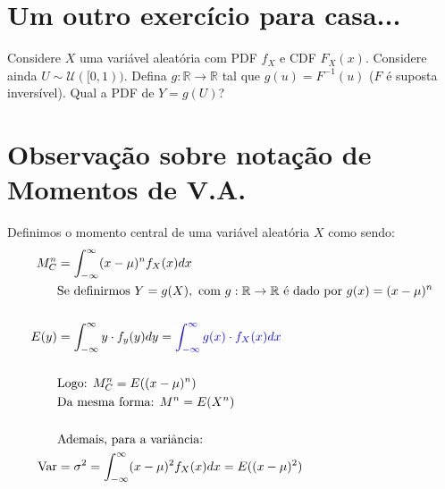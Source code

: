 \documentclass{article}
\makeatletter
\newcommand{\bb}[1]{\mathbb{#1}}
\def\mcolor#1#{\@mcolor{#1}}
\def\@mcolor#1#2#3{%
  \protect\leavevmode
  \begingroup
    \color#1{#2}#3%
  \endgroup
}
\makeatother
\begin{document}
\section{Um outro exercício para casa...}
Considere $X$ uma variável aleatória com PDF $f_X$ e CDF $F_X(x)$. Considere ainda $U \sim
\mathscr{U}([0,1))$. Defina $g:\bb{R} \rightarrow \bb{R}$ tal que $g(u) = F^{-1}(u)$ ($F$ é suposta
inversível). Qual a PDF de $Y=g(U)$?

\section{Observação sobre notação de Momentos de V.A.}
Definimos o momento central de uma variável aleatória $X$ como sendo:
\begin{align*}
    M_C^n &= \int_{-\infty}^\infty (x - \mu)^n f_X(x)dx \\
          &\text{Se definirmos } Y = g(X), \text{ com } g: \bb{R} \rightarrow \bb{R} \text{ é dado
          por } g(x) = (x - \mu)^n \\ \\
    E(y) &= \int^\infty_{-\infty} y \cdot f_y(y)dy = \mcolor{blue}{\int^\infty_{-\infty} g(x) \cdot
    f_X(x)dx} \\ \\
         &\text{Logo: } M_C^n = E((x - \mu)^n) \\
         &\text{Da mesma forma: } M^n = E(X^n) \\ \\
         &\text{Ademais, para a variância:} \\
        \text{Var} &= \sigma^2 = \int^{\infty}_{-\infty} (x-\mu)^2 f_X(x)dx = E((x - \mu)^2)
\end{align*}
\end{document}

